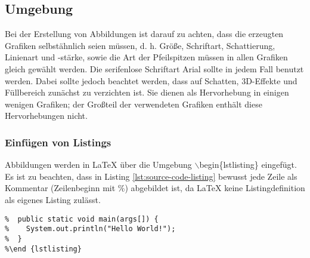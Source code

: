 \subsection{Umgebung}
Bei der Erstellung von Abbildungen ist darauf zu achten, dass die erzeugten Grafiken selbstähnlich seien müssen, d. h. Größe, Schriftart, Schattierung, Linienart und -stärke, sowie die Art der Pfeilspitzen müssen in allen Grafiken gleich gewählt werden. Die serifenlose Schriftart Arial sollte in jedem Fall benutzt werden. Dabei sollte jedoch beachtet werden, dass auf Schatten, 3D-Effekte  und Füllbereich zunächst zu verzichten ist. Sie dienen als Hervorhebung in einigen wenigen Grafiken; der Großteil der verwendeten Grafiken enthält diese Hervorhebungen nicht.



\subsubsection{Einfügen von Listings}
Abbildungen werden in \LaTeX{} über die Umgebung $\backslash$begin\{lstlisting\} eingefügt. Es ist zu beachten, dass in Listing \ref{lst:source-code-listing} bewusst jede Zeile als Kommentar (Zeilenbeginn mit \%) abgebildet ist, da \LaTeX{} keine Listingdefinition als eigenes Listing zulässt.

\begin{lstlisting}[caption={Quelltext für ein Listing},label=lst:source-code-listing]
%\begin{lstlisting}
%  public static void main(args[]) {
%    System.out.println("Hello World!");
%  }
%\end {lstlisting}
\end{lstlisting}
